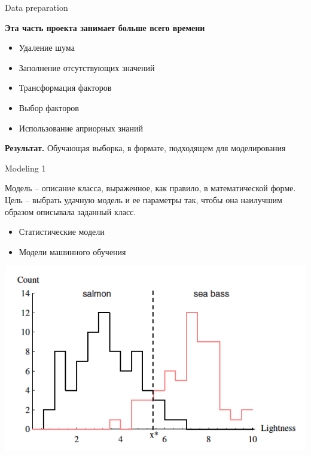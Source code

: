 \documentclass[10pt,a4paper]{beamer}
\begin{document}

\begin{frame}{Data preparation}

{\bf Эта часть проекта занимает больше всего времени}

\begin{itemize}
\item Удаление шума
\item Заполнение отсутствующих значений
\item Трансформация факторов
\item Выбор факторов
\item Использование априорных знаний
\end{itemize}
{\bf Результат.} Обучающая выборка, в формате, подходящем для моделирования

\end{frame}


\begin{frame}{Modeling 1}

Модель -- описание класса, выраженное, как правило, в математической форме. Цель -- выбрать удачную модель и ее параметры так, чтобы она наилучшим образом описывала заданный класс.

\begin{itemize}
\item Статистические модели
\item Модели машинного обучения
\end{itemize}

\begin{center}
\includegraphics[scale=0.3]{images/2.png}
\end{center}

\end{frame}
\end{document}
